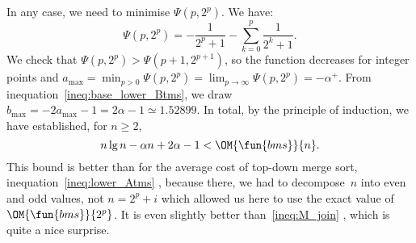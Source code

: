 In any case, we need to minimise \(\Psi(p,2^p)\). We have:
\begin{equation*}
  \Psi(p,2^p) = - \frac{1}{2^p+1} - \sum_{k=0}^{p}\frac{1}{2^k+1}.
\end{equation*}
We check that \(\Psi(p,2^p) > \Psi(p+1,2^{p+1})\), so the function
decreases for integer points and \(a_{\max} = \min_{p > 0}\Psi(p,2^p)
= \lim_{p \to \infty}\Psi(p,2^p) = -\alpha^{+}\). From
inequation~\eqref{ineq:base_lower_Btms}, we draw \(b_{\max} =
-2a_{\max} - 1 = 2\alpha - 1 \simeq 1.52899\). In total, by the
principle of induction, we have established, for \(n \geqslant 2\),
\begin{equation*}
n\lg n - \alpha n + 2\alpha -1 < \OM{\fun{bms}}{n}.
\end{equation*}
This bound is better than for the average cost of top\hyp{}down merge
sort, inequation~\eqref{ineq:lower_Atms} ,
because there, we had to decompose~\(n\) into even and odd values, not
\(n=2^p+i\) which allowed us here to use the exact value of
\(\OM{\fun{bms}}{2^p}\). It is even slightly better
than~\eqref{ineq:M_join} , which is quite a nice
surprise.


